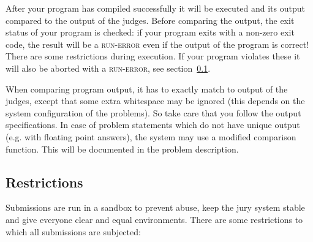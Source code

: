 After your program has compiled successfully it will be executed and
its output compared to the output of the judges. Before comparing the
output, the exit status of your program is checked: if your program
exits with a non-zero exit code, the result will be a \textsc{run-error}
even if the output of the program is correct!
There are some restrictions during execution. If your program violates
these it will also be aborted with a \textsc{run-error},
see section~\ref{runlimits}.

When comparing program output, it has to exactly match to output of
the judges, except that some extra whitespace may be ignored (this
depends on the system configuration of the problems). So take care
that you follow the output specifications. In case of problem
statements which do not have unique output (e.g. with floating point
answers), the system may use a modified comparison function.
This will be documented in the problem description.

\subsection{Restrictions}\label{runlimits}


Submissions are run in a sandbox to prevent abuse, keep the jury system stable and give everyone
clear and equal environments. There are some restrictions to which all submissions are subjected:

